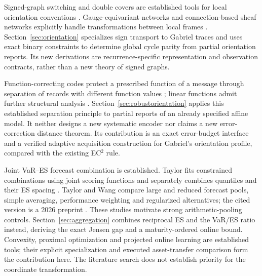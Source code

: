 \documentclass[11pt,a4paper]{article}
\theoremstyle{definition}\newtheorem{definition}[theorem]{Definition}
\begin{document}
Signed-graph switching and double covers are established tools for local orientation conventions \cite{zaslavsky1982}. Gauge-equivariant networks and connection-based sheaf networks explicitly handle transformations between local frames \cite{cohen2019gauge,barbero2022}. Section~\ref{sec:orientation} specializes sign transport to Gabriel traces and uses exact binary constraints to determine global cycle parity from partial orientation reports. Its new derivations are recurrence-specific representation and observation contracts, rather than a new theory of signed graphs.

Function-correcting codes protect a prescribed function of a message through separation of records with different function values \cite{lenz2023fcc}; linear functions admit further structural analysis \cite{premlal2025fcc}. Section~\ref{sec:robustorientation} applies this established separation principle to partial reports of an already specified affine model. It neither designs a new systematic encoder nor claims a new error-correction distance theorem. Its contribution is an exact error-budget interface and a verified adaptive acquisition construction for Gabriel's orientation profile, compared with the existing EC$^2$ rule.

Joint VaR--ES forecast combination is established. Taylor fits constrained combinations using joint scoring functions and separately combines quantiles and their ES spacing \cite{taylor2020combinations}. Taylor and Wang compare large and reduced forecast pools, simple averaging, performance weighting and regularized alternatives; the cited version is a 2026 preprint \cite{taylor2026largepool}. These studies motivate strong arithmetic-pooling controls. Section~\ref{sec:aggregation} combines reciprocal ES and the VaR/ES ratio instead, deriving the exact Jensen gap and a maturity-ordered online bound. Convexity, proximal optimization and projected online learning are established tools; their explicit specialization and executed asset-transfer comparison form the contribution here. The literature search does not establish priority for the coordinate transformation.
\end{document}
